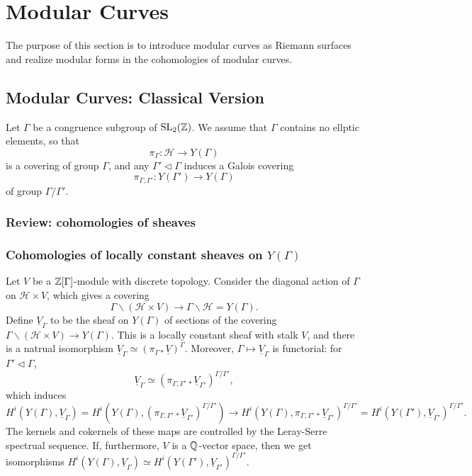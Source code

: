 \section{Modular Curves}
The purpose of this section is to
introduce modular curves as Riemann surfaces and
realize modular forms in the cohomologies of modular curves.

\subsection{Modular Curves: Classical Version}
Let $\Gamma$ be a congruence subgroup of $\operatorname{SL}_2(\mathbb{Z})$.
We assume that $\Gamma$ contains no ellptic elements,
so that \[\pi_\Gamma : \mathcal{H}\to Y(\Gamma)\] is a covering of group $\Gamma$,
and any $\Gamma'\triangleleft \Gamma$ induces a Galois covering \[\pi_{\Gamma, \Gamma'} : Y(\Gamma')\to Y(\Gamma)\] of group $\Gamma/\Gamma'$.

\subsubsection{Review: cohomologies of sheaves}

\subsubsection{Cohomologies of locally constant sheaves on \texorpdfstring{$Y(\Gamma)$}{Y(Gamma)}}
Let $V$ be a $\mathbb{Z}[\Gamma]$-module with discrete topology.
Consider the diagonal action of $\Gamma$ on $\mathcal{H}\times V$,
which gives a covering \[\Gamma\backslash( \mathcal{H}\times V)\to \Gamma\backslash\mathcal{H} = Y(\Gamma).\]
Define $\underline{V}_\Gamma$ to be the sheaf on $Y(\Gamma)$ of sections of the covering $\Gamma\backslash( \mathcal{H}\times V)\to Y(\Gamma)$.
This is a locally constant sheaf with stalk $V$,
and there is a natrual isomorphism $\underline{V}_\Gamma\simeq (\pi_{\Gamma*}\underline{V})^\Gamma$.
Moreover, $\Gamma\mapsto \underline{V}_\Gamma$ is functorial: for $\Gamma'\triangleleft\Gamma$,
\[\underline{V}_\Gamma \simeq \left( \pi_{\Gamma, \Gamma'\,*}\underline{V}_{\Gamma'} \right)^{\Gamma/\Gamma'},\]
which induces
\[H^i(Y(\Gamma), \underline{V}_\Gamma) = H^i\left(Y(\Gamma), \left( \pi_{\Gamma, \Gamma'\,*}\underline{V}_{\Gamma'} \right)^{\Gamma/\Gamma'}\right)
\to H^i(Y(\Gamma), \pi_{\Gamma, \Gamma'\,*}\underline{V}_{\Gamma'})^{\Gamma/\Gamma'} = H^i(Y(\Gamma'), \underline{V}_{\Gamma'})^{\Gamma/\Gamma'}.\]
The kernels and cokernels of these maps are controlled by the Leray-Serre spectrual sequence.
If, furthermore, $V$ is a $\mathbb{Q}$-vector space,
then we get isomorphisms $H^i(Y(\Gamma), \underline{V}_\Gamma)\simeq H^i(Y(\Gamma'), \underline{V}_{\Gamma'})^{\Gamma/\Gamma'}$.


